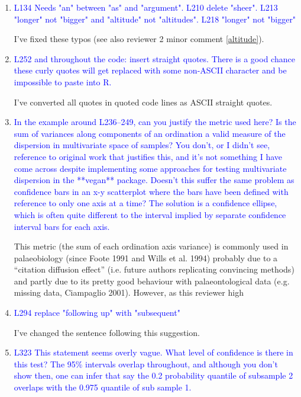 \documentclass[12pt,letterpaper]{article}
\begin{document}
\begin{enumerate}
\item{\textcolor{blue}{L134 Needs "an" between "as" and "argument". L210 delete "sheer". L213 "longer" not "bigger" and "altitude" not "altitudes". L218 "longer" not "bigger"}}

I've fixed these typos (see also reviewer 2 minor comment \ref{altitude}).

\item{\textcolor{blue}{L252 and throughout the code: insert straight quotes. There is a good chance these curly quotes will get replaced with some non-ASCII character and be impossible to paste into R.}}

I've converted all quotes in quoted code lines as ASCII straight quotes.

\item{\textcolor{blue}{In the example around L236--249, can you justify the metric used here? Is the sum of variances along components of an ordination a valid measure of the dispersion in multivariate space of samples? You don't, or I didn't see, reference to original work that justifies this, and it's not something I have come across despite implementing some approaches for testing multivariate dispersion in the **vegan** package. Doesn't this suffer the same problem as confidence bars in an x-y scatterplot where the bars have been defined with reference to only one axis at a time? The solution is a confidence ellipse, which is often quite different to the interval implied by separate confidence interval bars for each axis.}}

This metric (the sum of each ordination axis variance) is commonly used in palaeobiology (since Foote 1991 and Wills et al. 1994) probably due to a ``citation diffusion effect'' (i.e. future authors replicating convincing methods) and partly due to its pretty good behaviour with palaeontological data (e.g. missing data, Ciampaglio 2001).
However, as this reviewer high


\item{\textcolor{blue}{L294 replace "following up" with "subsequent"}}

I've changed the sentence following this suggestion.

\item{\textcolor{blue}{L323 This statement seems overly vague. What level of confidence is there in this test? The 95\% intervals overlap throughout, and although you don't show then, one can infer that say the 0.2 probability quantile of subsample 2 overlaps with the 0.975 quantile of sub sample 1.}}


\end{enumerate}
\end{document}
